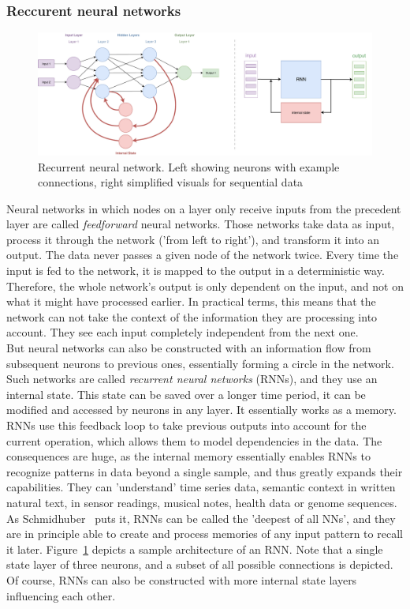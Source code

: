 \documentclass[
a4paper,
pagesize,
pdftex,
12pt,
twoside, %
BCOR=5mm, %
ngerman,
fleqn,
final,
]{scrartcl}
\begin{document}
	\subsubsection{Reccurent neural networks}\label{RNN}
	\begin{figure}[ht]
		\centering
		\includegraphics[width=\linewidth]{img/RecurrentNeuralNetwork}
		\caption{Recurrent neural network. Left showing neurons with example connections, right simplified visuals for sequential data}
		\label{fig:rnn}
	\end{figure}
	Neural networks in which nodes on a layer only receive inputs from the precedent layer are called \textit{feedforward} neural networks. Those networks take data as input, process it through the network ('from left to right'), and transform it into an output. The data never passes a given node of the network twice. Every time the input is fed to the network, it is mapped to the output in a deterministic way. Therefore, the whole network's output is only dependent on the input, and not on what it might have processed earlier. In practical terms, this means that the network can not take the context of the information they are processing into account. They see each input completely independent from the next one.\\
	But neural networks can also be constructed with an information flow from subsequent neurons to previous ones, essentially forming a circle in the network. Such networks are called \textit{recurrent neural networks} (RNNs), and they use an internal state. This state can be saved over a longer time period, it can be modified and accessed by neurons in any layer. It essentially works as a memory. RNNs use this feedback loop to take previous outputs into account for the current operation, which allows them to model dependencies in the data. The consequences are huge, as the internal memory essentially enables RNNs to recognize patterns in data beyond a single sample, and thus greatly expands their capabilities. They can 'understand' time series data, semantic context in written natural text, in sensor readings, musical notes, health data or genome sequences. As Schmidhuber~\cite{Schmidhuber.2015} puts it, RNNs can be called the 'deepest of all NNs', and they are in principle able to create and process memories of any input pattern to recall it later. Figure~\ref{fig:rnn} depicts a sample architecture of an RNN. Note that a single state layer of three neurons, and a subset of all possible connections is depicted. Of course, RNNs can also be constructed with more internal state layers influencing each other.\\
\end{document}
